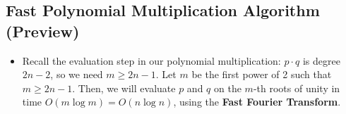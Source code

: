 \subsection{Fast Polynomial Multiplication Algorithm (Preview)}
\begin{itemize}
	\item Recall the evaluation step in our polynomial multiplication: \( p \cdot q \) is degree \( 2n - 2 \), so we need 
		\( m \ge 2n - 1 \). Let \( m \) be the first power of 2 such that \( m \ge  2n - 1 \). Then, we will evaluate \( p \) 
		and \( q \) on the \( m \)-th roots of unity in time \( O(m \log m) = O(n \log n)\), 
		using the \textbf{Fast Fourier Transform}.  
\end{itemize}
